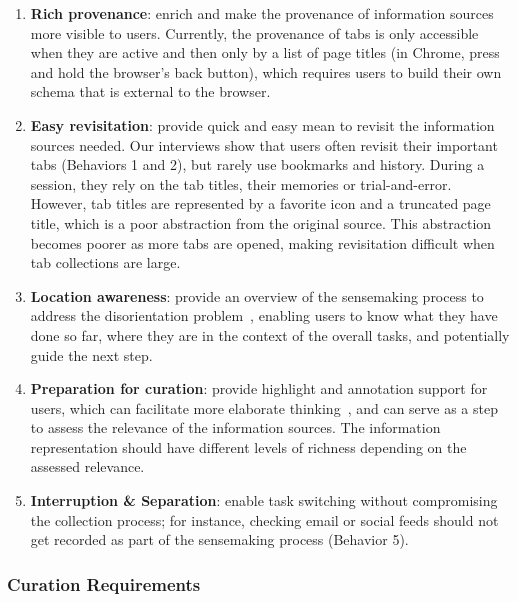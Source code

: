 \begin{enumerate}
	\item \textbf{Rich provenance}: enrich and make the provenance of information sources more visible to users. Currently, the provenance of tabs is only accessible when they are active and then only by a list of page titles (in Chrome, press and hold the browser's back button), which requires users to build their own schema that is external to the browser.
	\item \textbf{Easy revisitation}: provide quick and easy mean to revisit the information sources needed. Our interviews show that users often revisit their important tabs (Behaviors 1 and 2), but rarely use bookmarks and history. During a session, they rely on the tab titles, their memories or trial-and-error. However, tab titles are represented by a favorite icon and a truncated page title, which is a poor abstraction from the original source. This abstraction becomes poorer as more tabs are opened, making revisitation difficult when tab collections are large.
	\item \textbf{Location awareness}: provide an overview of the sensemaking process to address the disorientation problem~\cite{Conklin1987}, enabling users to know what they have done so far, where they are in the context of the overall tasks, and potentially guide the next step.
	\item \textbf{Preparation for curation}: provide highlight and annotation support for users, which can facilitate more elaborate thinking~\cite{Sedig2013}, and can serve as a step to assess the relevance of the information sources. The information representation should have different levels of richness depending on the assessed relevance.
	\item \textbf{Interruption \& Separation}: enable task switching without compromising the collection process; for instance, checking email or social feeds should not get recorded as part of the sensemaking process (Behavior 5).

	\setcounter{listnum}{\theenumi}
\end{enumerate}

\subsubsection{Curation Requirements}

